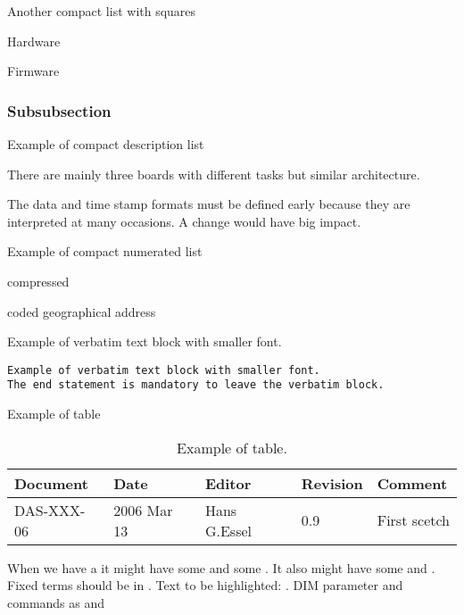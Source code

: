 Another compact list with squares
\bbox
\item Hardware
\item Firmware
\ebox

\subsubsection{Subsubsection}

Example of compact description list
\bdes
\item[Hardware] There are mainly three boards with different tasks but similar architecture.
\item[Data formats] The data and time stamp formats must be defined early because they are
interpreted at many occasions. A change would have big impact.
\edes

Example of compact numerated list
\bnum
\item compressed
\item coded geographical address
\enum

Example of verbatim text block with smaller font.
{\small \begin{verbatim}
Example of verbatim text block with smaller font.
The end statement is mandatory to leave the verbatim block.
\end{verbatim}
}


Example of table
\begin{table}[h]
\begin{tabular}{|p{2.0cm}|p{2.0cm}|p{3.0cm}|p{1.6cm}|p{5.0cm}|}      \hline
Document   & Date        & Editor       & Revision & Comment      \\ \hline
DAS-XXX-06 & 2006 Mar 13 & Hans G.Essel & 0.9      & First scetch \\ \hline
\end{tabular}
\caption{Example of table.}
\label{XXX-table}
\end{table}

When we have a  it might have some  and some .
It also might have some  and .
Fixed terms should be in . Text to be highlighted: .
DIM parameter and commands as  and 
